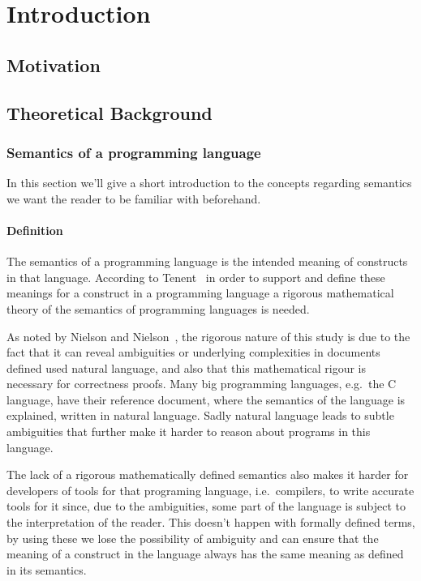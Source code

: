\chapter{Introduction}\label{chapter:introduction}

\section{Motivation}

\section{Theoretical Background}

\subsection{Semantics of a programming language}

In this section we'll give a short introduction to the concepts regarding semantics we want the reader to be familiar with beforehand.

\subsubsection{Definition}

The semantics of a programming language is the intended meaning of constructs in that language.
According to Tenent~\parencite{tennent} in order to support and define these meanings for a construct in a programming language a rigorous mathematical theory of the semantics of programming languages is needed.

As noted by Nielson and Nielson~\parencite{nielson}, the rigorous nature of this study is due to the fact that it can reveal ambiguities or underlying complexities in documents defined used natural language, and also that this mathematical rigour is necessary for correctness proofs.
Many big programming languages, e.g.\ the C language, have their reference document, where the semantics of the language is explained, written in natural language.
Sadly natural language leads to subtle ambiguities that further make it harder to reason about programs in this language.

The lack of a rigorous mathematically defined semantics also makes it harder for developers of tools for that programing language, i.e.\ compilers, to write accurate tools for it since, due to the ambiguities, some part of the language is subject to the interpretation of the reader.
This doesn't happen with formally defined terms, by using these we lose the possibility of ambiguity and can ensure that the meaning of a construct in the language always has the same meaning as defined in its semantics.

